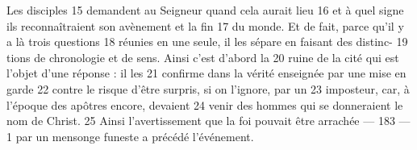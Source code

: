 Les disciples	 
15	 	demandent au Seigneur quand cela aurait lieu	 
16	 	et à quel signe ils reconnaîtraient son avènement et la fin	 
17	 	du monde. Et de fait, parce qu'il y a là trois questions	 
18	 	réunies en une seule, il les sépare en faisant des distinc-	 
19	 	tions de chronologie et de sens. Ainsi c'est d'abord la	 
20	 	ruine de la cité qui est l'objet d'une réponse : il les	 
21	 	confirme dans la vérité enseignée par une mise en garde	 
22	 	contre le risque d'être surpris, si on l'ignore, par un	 
23	 	imposteur, car, à l'époque des apôtres encore, devaient	 
24	 	venir des hommes qui se donneraient le nom de Christ.	 
25	 	Ainsi l'avertissement que la foi pouvait être arrachée	 
 	--- 183 ---	 
1	 	par un mensonge funeste a précédé l'événement.